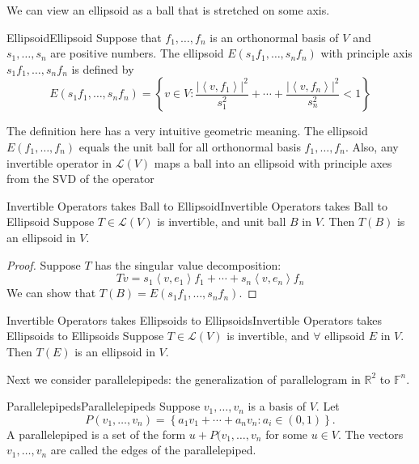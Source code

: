 \documentclass[../main.tex]{subfiles}
\begin{document}
We can view an ellipsoid as a ball that is stretched on some axis.

\begin{definition}{Ellipsoid}{Ellipsoid}
Suppose that $f_1, \ldots ,f_n$ is an orthonormal basis of $V$ and $s_1, \ldots ,s_n$ are positive numbers. The ellipsoid $E(s_1f_1, \ldots ,s_nf_n)$ with principle axis $s_1f_1, \ldots ,s_nf_n$ is defined by
\begin{equation}
E(s_1f_1, \ldots ,s_nf_n) = \left\{ v\in V: \frac{\left|\left<v,f_1\right>\right|^2}{s_1^2} +\cdots + \frac{\left|\left<v,f_n\right>\right|^2}{s_n^2} < 1 \right\}
\end{equation}
\end{definition}

The definition here has a very intuitive geometric meaning. The ellipsoid $E(f_1, \ldots ,f_n)$ equals the unit ball for all orthonormal basis $f_1, \ldots ,f_n$. Also, any invertible operator in $\mathscr{L}(V)$ maps a ball into an ellipsoid with principle axes from the SVD of the operator

\begin{theorem}{Invertible Operators takes Ball to Ellipsoid}{Invertible Operators takes Ball to Ellipsoid}
Suppose $T\in \mathscr{L}(V)$ is invertible, and unit ball  $B$ in $V$. Then $T(B)$ is an ellipsoid in $V$.
\end{theorem}
\begin{proof}
Suppose $T$ has the singular value decomposition:
\begin{equation*}
Tv = s_1 \left<v,e_1\right>f_1 +\cdots +s_n \left<v,e_n\right>f_n
\end{equation*}
We can show that $T(B) = E(s_1f_1, \ldots ,s_nf_n)$.
\end{proof}

\begin{corollary}{Invertible Operators takes Ellipsoids to Ellipsoids}{Invertible Operators takes Ellipsoids to Ellipsoids}
Suppose $T\in \mathscr{L}(V)$ is invertible, and $\forall $ ellipsoid $E$ in $V$. Then $T(E)$ is an ellipsoid in $V$.
\end{corollary}

Next we consider parallelepipeds: the generalization of parallelogram in $\mathbb{R}^2$ to $\mathbb{F}^n$.
\begin{definition}{Parallelepipeds}{Parallelepipeds}
Suppose $v_1, \ldots ,v_n$ is a basis of $V$. Let
\begin{equation*}
P(v_1, \ldots ,v_n) = \left\{ a_1v_1+\cdots +a_nv_n: a_i\in (0,1) \right\}.
\end{equation*}
A parallelepiped is a set of the form $u+P(v_1, \ldots ,v_n$ for some $u\in V$. The vectors $v_1, \ldots ,v_n$ are called the edges of the parallelepiped.
\end{definition}
\end{document}
